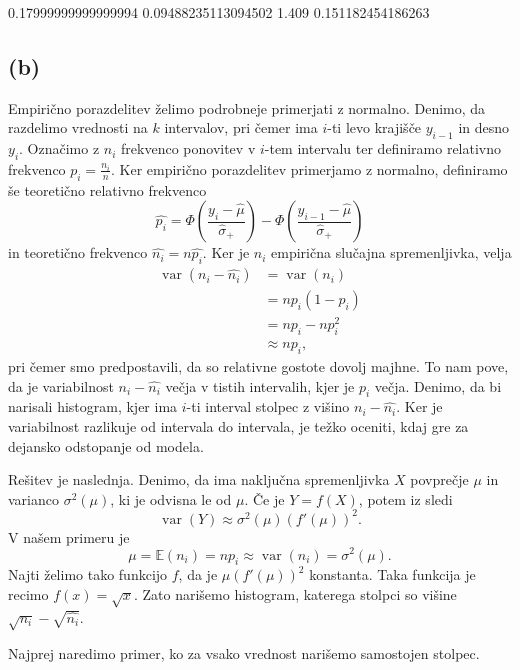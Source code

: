 \documentclass[10pt, a4paper]{article}
\newcommand{\E}{\mathbb {E}}
\DeclareMathOperator{\var}{var}
\begin{document}
\begin{python}
    0.17999999999999994 0.09488235113094502 1.409 0.151182454186263
\end{python}

\subsection*{(b)}

Empirično porazdelitev želimo podrobneje primerjati z normalno.
Denimo, da razdelimo vrednosti na $k$ intervalov, pri čemer ima $i$-ti 
levo krajišče $y_{i - 1}$ in desno $y_i$. Označimo z $n_i$ frekvenco 
ponovitev v $i$-tem intervalu ter definiramo relativno frekvenco $p_i = \frac{n_i}{n}$.
Ker empirično porazdelitev primerjamo z normalno, definiramo še teoretično relativno frekvenco 
$$\widehat{p_i} = \Phi \left(\frac{y_i - \widehat{\mu}}{\widehat{\sigma}_+}\right) - \Phi \left(\frac{y_{i - 1} - \widehat{\mu}}{\widehat{\sigma}_+}\right)$$
in teoretično frekvenco $\widehat{n_i} = n \widehat{p_i}$. 
Ker je $n_i$ empirična slučajna spremenljivka, velja 
\begin{align*}
    \var (n_i - \widehat{n_i}) &= \var(n_i)\\
    &= n p_i (1 - p_i)\\
    &= np_i - np_i^2\\
    &\approx np_i,
\end{align*}
pri čemer smo predpostavili, da so relativne gostote dovolj majhne.
To nam pove, da je variabilnost $n_i - \widehat{n_i}$ večja v tistih intervalih,
kjer je $p_i$ večja. Denimo, da bi narisali histogram, kjer ima $i$-ti interval 
stolpec z višino $n_i - \widehat{n_i}$. 
Ker je variabilnost razlikuje od intervala do intervala, je težko oceniti, 
kdaj gre za dejansko odstopanje od modela.

Rešitev je naslednja. Denimo, da ima naključna spremenljivka $X$ povprečje $\mu$
in varianco $\sigma^2 (\mu)$, ki je odvisna le od $\mu$. Če je $Y = f(X)$, potem iz \cite{rice} sledi 
$$\var (Y) \approx \sigma^2 (\mu) (f'(\mu))^2.$$
V našem primeru je 
$$\mu = \E(n_i) = np_i \approx \var (n_i) = \sigma^2 (\mu).$$
Najti želimo tako funkcijo $f$, da je $\mu (f'(\mu))^2$ konstanta.
Taka funkcija je recimo $f(x) = \sqrt{x}$. Zato narišemo histogram, katerega stolpci so višine 
$\sqrt{n_i} - \sqrt{\widehat{n_i}}$.

Najprej naredimo primer, ko za vsako vrednost narišemo samostojen stolpec.
\end{document}
